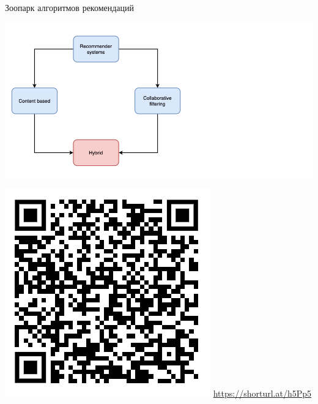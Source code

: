 \documentclass[11pt,aspectratio=169]{beamer}
\begin{document}
\begin{frame}{Зоопарк алгоритмов рекомендаций \cite{ali_2021}}

\begin{center}
\includegraphics[scale=0.27]{images/taxonomy-4.png}
\end{center}

\includegraphics[scale=0.3]{images/poll.png} \hfill \url{https://shorturl.at/h5Pp5}

\end{frame}
\end{document}
